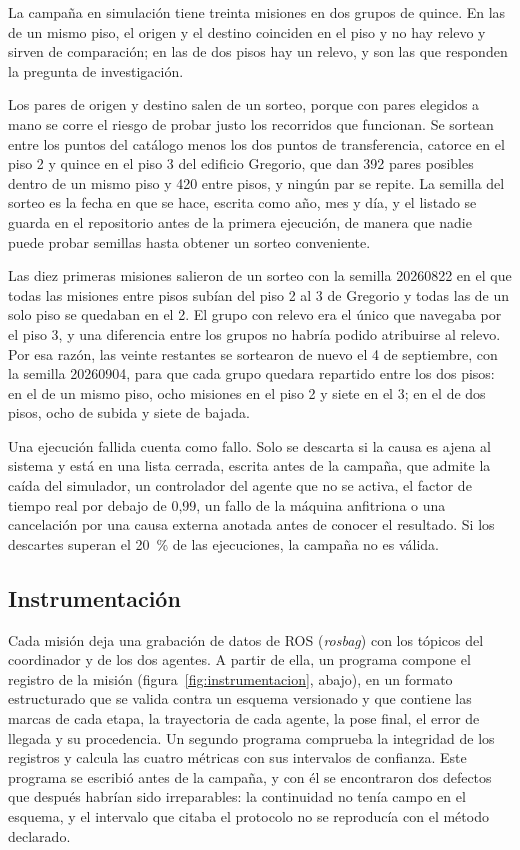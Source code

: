 La campaña en simulación tiene treinta misiones en dos grupos de quince. En las de un mismo piso, el origen y el destino coinciden en el piso y no hay relevo y sirven de comparación; en las de dos pisos hay un
relevo, y son las que responden la pregunta de investigación.

Los pares de origen y destino salen de un sorteo, porque con pares elegidos a mano se corre el riesgo de probar justo los recorridos que funcionan. Se sortean entre los puntos del catálogo menos los dos puntos de transferencia, catorce
en el piso 2 y quince en el piso 3 del edificio Gregorio, que dan 392 pares posibles dentro de un mismo piso y 420 entre pisos, y ningún par se repite. La semilla del sorteo es la fecha en que se hace, escrita como año, mes y día, y el listado se guarda en
el repositorio antes de la primera ejecución, de manera que nadie puede probar semillas hasta obtener un sorteo conveniente.

Las diez primeras misiones salieron de un sorteo con la semilla 20260822 en el que todas las misiones entre pisos subían del piso 2 al 3 de Gregorio y todas las de un solo piso se quedaban en el 2. El grupo con relevo era el único que navegaba por
el piso 3, y una diferencia entre los grupos no habría podido atribuirse al relevo. Por esa razón, las veinte restantes se sortearon de nuevo el 4 de septiembre, con la semilla 20260904, para que cada grupo quedara repartido
entre los dos pisos: en el de un mismo piso, ocho misiones en el piso 2 y siete en el 3; en el de dos pisos, ocho de subida y siete de bajada.

Una ejecución fallida cuenta como fallo. Solo se descarta si la causa es ajena al sistema y está en una lista cerrada, escrita antes de la campaña, que admite la caída del simulador, un controlador del agente que no se activa, el factor
de tiempo real por debajo de 0,99, un fallo de la máquina anfitriona o una cancelación por una causa externa anotada antes de conocer el resultado. Si los descartes superan el 20~\% de las ejecuciones, la campaña no es válida.

\subsection{Instrumentación}
\label{sec:instrumentacion}

Cada misión deja una grabación de datos de ROS (\textit{rosbag}) con los tópicos del coordinador y de los dos agentes. A partir de ella, un programa compone el registro de la misión (figura~\ref{fig:instrumentacion}, abajo), en un formato estructurado que se valida contra un
esquema versionado y que contiene las marcas de cada etapa, la trayectoria de cada agente, la pose final, el error de llegada y su procedencia. Un segundo programa comprueba la integridad de los registros y calcula las cuatro métricas con
sus intervalos de confianza. Este programa se escribió antes de la campaña, y con él se encontraron dos defectos que después habrían sido irreparables: la continuidad no tenía campo en el esquema, y el intervalo que citaba el protocolo no
se reproducía con el método declarado.

